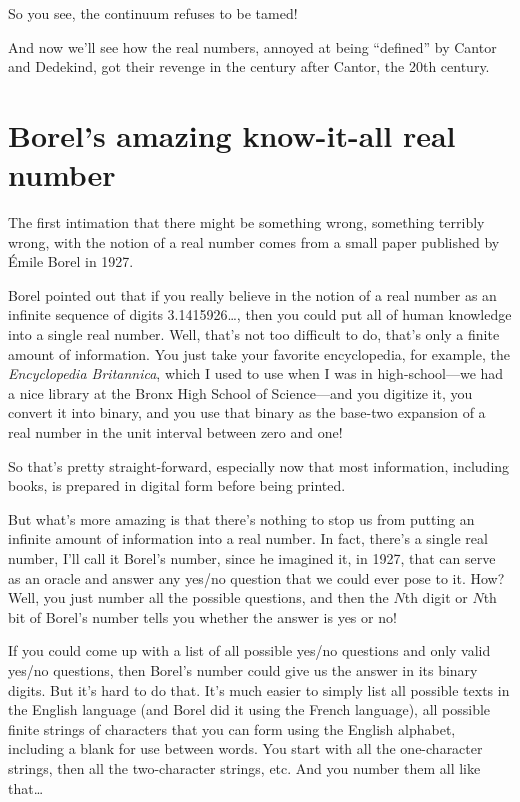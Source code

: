 \documentclass[12pt]{book}
\begin{document}
So you see, the continuum refuses to be tamed!
 
And now we'll see how the real numbers, annoyed at being ``defined''
by Cantor and Dedekind, got their revenge in the century after Cantor,
the 20th century.

\section*{Borel's amazing know-it-all real number}

The first intimation that there might be something wrong, something terribly wrong,
with the notion of a real number comes from a small paper published by \'Emile Borel in 1927.
 
Borel pointed out that if you really believe in the notion of a real number as
an infinite sequence of digits 3.1415926\ldots, then you could put all of human knowledge
into a single real number.  Well, that's not too difficult to do, that's only a finite
amount of information. You just take your favorite encyclopedia, for example, the 
\emph{Encyclopedia Britannica}, which I used to use when I was in high-school---we had a nice
library at the Bronx High School of Science---and you digitize it, you convert it into
binary, and you use that binary as the base-two expansion of a real number in the unit
interval between zero and one!
 
So that's pretty straight-forward, especially now that most information, including books,
is prepared in digital form before being printed.
 
But what's more amazing is that there's nothing to stop us from putting an infinite amount
of information into a real number.
In fact, there's a single real number, I'll call it Borel's number, since he imagined it, in 1927,
that can serve as an oracle and answer any yes/no question that we could ever pose to it.
How? Well, you just number all the possible questions, and then the $N$th digit or $N$th
bit of Borel's number tells you whether the answer is yes or no!
 
If you could come up with a list of all possible yes/no questions and only valid yes/no questions, 
then Borel's number
could give us the answer in its binary digits.
But it's hard to do that.  It's much easier to simply list all possible texts in the
English language (and Borel did it using the French language), all possible finite strings of
characters that you can form using the English alphabet, including a blank for use between
words.  You start with all the one-character strings, then all the two-character strings, etc.
And you number them all like that\ldots
 
\end{document}
